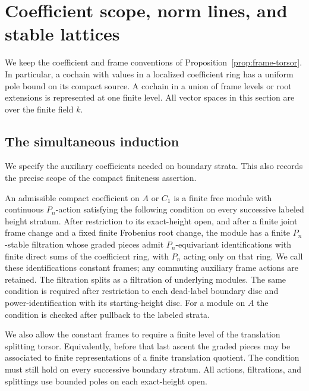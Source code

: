 \section{Coefficient scope, norm lines, and stable lattices}
\label{sec:coefficient-scope}

We keep the coefficient and frame conventions of
Proposition~\ref{prop:frame-torsor}.  In particular, a cochain with values
in a localized coefficient ring has a uniform pole bound on its compact
source.  A cochain in a union of frame levels or root extensions is
represented at one finite level.  All vector spaces in this section are
over the finite field $k$.

\subsection{The simultaneous induction}

We specify the auxiliary coefficients needed on boundary strata.  This
also records the precise scope of the compact finiteness assertion.

\begin{definition}\label{def:compact:admissible}
An admissible compact coefficient on $A$ or $C_1$ is a finite free module
with continuous $P_n$-action satisfying the following condition on every
successive labeled height stratum.  After restriction to its exact-height
open, and after a finite joint frame change and a fixed finite Frobenius
root change, the module has a finite $P_n$-stable filtration whose graded pieces
admit $P_n$-equivariant identifications with finite direct sums of
the coefficient ring, with $P_n$ acting only on that ring.
We call these identifications constant frames; any commuting
auxiliary frame actions are retained.  The filtration splits as
a filtration of underlying modules.
The same condition is required after restriction to each dead-label
boundary disc and power-identification with its starting-height disc.
For a module on $A$ the condition is checked after pullback to the labeled
strata.

We also allow the constant frames to require a finite level of the
translation splitting torsor.  Equivalently, before that last ascent the
graded pieces may be associated to finite representations of a finite
translation quotient.  The condition must still hold on every successive
boundary stratum.  All actions, filtrations, and splittings use bounded
poles on each exact-height open.
\end{definition}

